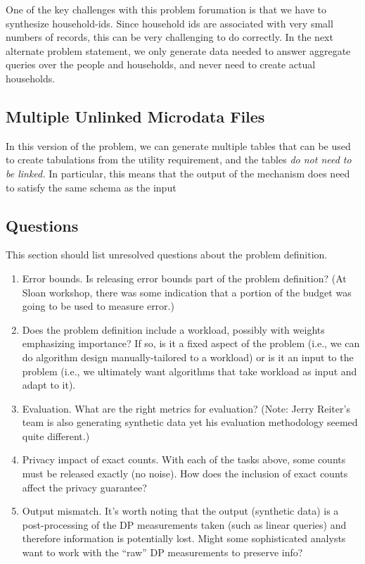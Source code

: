 \documentclass{amsart}
\begin{document}
One of the key challenges with this  problem forumation is that we have to synthesize household-ids. Since household ids are associated with very small numbers of records, this can be very challenging to do correctly. In the next alternate problem statement, we only generate data needed to answer aggregate queries over the people and households, and never need to create actual households. 

\subsection{Multiple Unlinked Microdata Files}
In this version of the problem, we can generate multiple tables that can be used to create tabulations from the utility requirement, and the tables \emph{do not need to be linked.} In particular, this means that the output of the mechanism does need to satisfy the same schema as the input






\subsection{Questions} \label{sec:questions}

This section should list unresolved questions about the problem definition.  
\begin{enumerate}
\item Error bounds.  Is releasing error bounds part of the problem definition?  (At Sloan workshop, there was some indication that a portion of the budget was going to be used to measure error.)
\item Does the problem definition include a workload, possibly with weights emphasizing importance?  If so, is it a fixed aspect of the problem (i.e., we can do algorithm design manually-tailored to a workload) or is it an input to the problem (i.e., we ultimately want algorithms that take workload as input and adapt to it).  
\item Evaluation.  What are the right metrics for evaluation?  (Note: Jerry Reiter’s team is also generating synthetic data yet his evaluation methodology seemed quite different.)  
\item Privacy impact of exact counts.  With each of the tasks above, some counts must be released exactly (no noise).  How does the inclusion of exact counts affect the privacy guarantee?
\item Output mismatch.  It's worth noting that the output (synthetic data) is a post-processing of the DP measurements taken (such as linear queries) and therefore information is potentially lost.  Might some sophisticated analysts want to work with the ``raw'' DP measurements to preserve info?
\end{enumerate}
\end{document}
